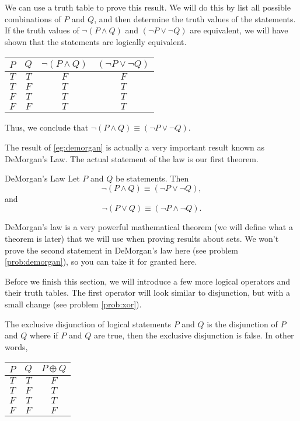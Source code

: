 \begin{example}{}\label{eg:demorgan}
	We can use a truth table to prove this result. We will do this by list all possible combinations of $P$ and $Q$, and then determine the truth values of the statements. If the truth values of $\neg(P \land Q)$ and $(\neg P \lor \neg Q)$ are equivalent, we will have shown that the statements are logically equivalent.
	\begin{center}
		\begin{tabular}{c | c | c | c}
			$P$ & $Q$ & $\neg(P \land Q)$ & $(\neg P \lor \neg Q)$ \\
			\hline
			$T$ & $T$ & $F$               & $F$                    \\
			$T$ & $F$ & $T$               & $T$                    \\
			$F$ & $T$ & $T$               & $T$                    \\
			$F$ & $F$ & $T$               & $T$
		\end{tabular}
	\end{center}
	Thus, we conclude that $\neg(P \land Q) \equiv (\neg P \lor \neg Q)$.
\end{example}

The result of \cref{eg:demorgan} is actually a very important result known as DeMorgan's Law. The actual statement of the law is our first theorem.

\begin{theorem}{DeMorgan's Law}\label{thm:demorgan}
	Let $P$ and $Q$ be statements. Then
	\[\neg(P \land Q) \equiv (\neg P \lor \neg Q),\] and
	\[\neg(P\lor Q)\equiv (\neg P \land \neg Q).\]
\end{theorem}

DeMorgan's law is a very powerful mathematical theorem (we will define what a theorem is later) that we will use when proving results about sets. We won't prove the second statement in DeMorgan's law here (see problem \ref{prob:demorgan}), so you can take it for granted here.

Before we finish this section, we will introduce a few more logical operators and their truth tables. The first operator will look similar to disjunction, but with a small change (see problem \ref{prob:xor}).

\begin{definition}{}
	The exclusive disjunction of logical statements $P$ and $Q$ is the disjunction of $P$ and $Q$ where if $P$ and $Q$ are true, then the exclusive disjunction is false. In other words,
	\begin{center}
		\begin{tabular}{c | c | c}
			$P$ & $Q$ & $P\oplus Q$ \\
			\hline
			$T$ & $T$ & $F$         \\
			$T$ & $F$ & $T$         \\
			$F$ & $T$ & $T$         \\
			$F$ & $F$ & $F$
		\end{tabular}
	\end{center}
\end{definition}

